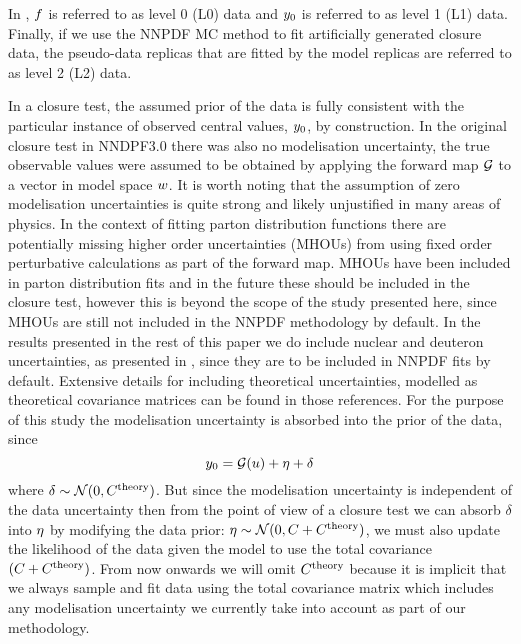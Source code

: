 In \cite{nnpdf30}, $f$ is referred to as level 0 (L0) data and
$y_0$ is referred to as level 1 (L1) data. Finally, if we use the
NNPDF MC method to fit artificially generated closure data, the pseudo-data
replicas that are fitted by the model replicas are referred to as level 2 (L2)
data.

In a closure test, the assumed prior of the data is fully consistent with the
particular instance of observed central values, $y_0$, by construction.
In the original closure test in NNDPF3.0 there was also no
modelisation uncertainty, the true observable values were assumed to be obtained
by applying the forward map $\mathcal{G}$ to a vector in model space $w$.
It is worth noting that the assumption of zero modelisation uncertainties is
quite strong and likely unjustified in many areas of physics. In the context of
fitting parton distribution functions there are potentially missing higher order
uncertainties (MHOUs) from using fixed order perturbative calculations as part
of the forward map. MHOUs have been included in parton distribution fits
\cite{AbdulKhalek:2019ihb} and in the future these should be included in the
closure test, however this is beyond the scope of the study presented here,
since MHOUs are still not included in the NNPDF methodology by default. In the
results presented in the rest of this paper we do include nuclear and deuteron
uncertainties, as presented in \cite{Ball:2018twp, Ball:2020xqw}, since they are
to be included in NNPDF fits by default. Extensive details for including
theoretical uncertainties, modelled as theoretical covariance matrices can be
found in those references. For the purpose of this study the modelisation
uncertainty is absorbed into the prior of the data, since
\begin{equation}
    y_0 = \mathcal{G}(u) + \eta + \delta
\end{equation}
where $\delta \sim \mathcal{N}(0, C^{\rm theory})$. But since the
modelisation uncertainty is independent of the data uncertainty then from the
point of view of a closure test we can absorb $\delta$ into $\eta$ by
modifying the data prior: $\eta \sim \mathcal{N}(0, C + C^{\rm theory})$,
we must also update the likelihood of the data given the model to use the total
covariance $(C + C^{\rm theory})$. From now onwards we will omit $C^{\rm
theory}$ because it is implicit that we always sample and fit data using the
total covariance matrix which includes any modelisation uncertainty we currently
take into account as part of our methodology.
